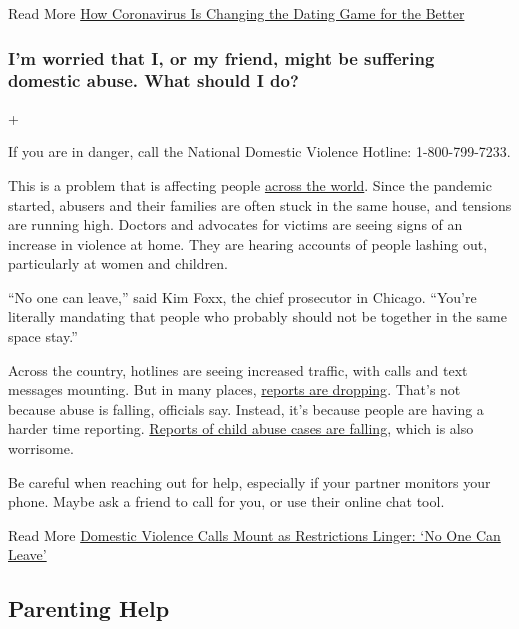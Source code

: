  Read More
\href{https://www.nytimes.com/2020/05/07/well/mind/dating-coronavirus-love-relationships.html}{How
Coronavirus Is Changing the Dating Game for the Better}

\hypertarget{im-worried-that-i-or-my-friend-might-be-suffering-domestic-abuse-what-should-i-do}{%
\subsubsection{I'm worried that I, or my friend, might be suffering
domestic abuse. What should I
do?}\label{im-worried-that-i-or-my-friend-might-be-suffering-domestic-abuse-what-should-i-do}}

+

If you are in danger, call the National Domestic Violence Hotline:
1-800-799-7233.

This is a problem that is affecting people
\href{https://www.nytimes.com/2020/04/06/world/coronavirus-domestic-violence.html}{across
the world}. Since the pandemic started, abusers and their families are
often stuck in the same house, and tensions are running high. Doctors
and advocates for victims are seeing signs of an increase in violence at
home. They are hearing accounts of people lashing out, particularly at
women and children.

``No one can leave,'' said Kim Foxx, the chief prosecutor in Chicago.
``You're literally mandating that people who probably should not be
together in the same space stay.''

Across the country, hotlines are seeing increased traffic, with calls
and text messages mounting. But in many places,
\href{https://www.nytimes.com/2020/04/17/nyregion/new-york-city-domestic-violence-coronavirus.html}{reports
are dropping}. That's not because abuse is falling, officials say.
Instead, it's because people are having a harder time reporting.
\href{https://www.nytimes.com/2020/06/09/nyregion/coronavirus-nyc-child-abuse.html}{Reports
of child abuse cases are falling}, which is also worrisome.

Be careful when reaching out for help, especially if your partner
monitors your phone. Maybe ask a friend to call for you, or use their
online chat tool.

 Read More
\href{https://www.nytimes.com/2020/05/15/us/domestic-violence-coronavirus.html}{Domestic
Violence Calls Mount as Restrictions Linger: `No One Can Leave'}

\hypertarget{parenting-help}{%
\subsection{Parenting Help}\label{parenting-help}}

